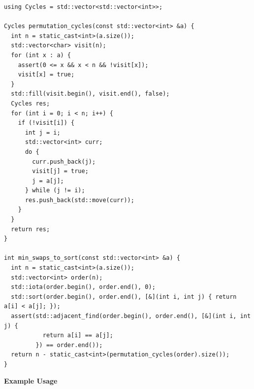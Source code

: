 \begin{lstlisting}[style=cpp]
using Cycles = std::vector<std::vector<int>>;

Cycles permutation_cycles(const std::vector<int> &a) {
  int n = static_cast<int>(a.size());
  std::vector<char> visit(n);
  for (int x : a) {
    assert(0 <= x && x < n && !visit[x]);
    visit[x] = true;
  }
  std::fill(visit.begin(), visit.end(), false);
  Cycles res;
  for (int i = 0; i < n; i++) {
    if (!visit[i]) {
      int j = i;
      std::vector<int> curr;
      do {
        curr.push_back(j);
        visit[j] = true;
        j = a[j];
      } while (j != i);
      res.push_back(std::move(curr));
    }
  }
  return res;
}

int min_swaps_to_sort(const std::vector<int> &a) {
  int n = static_cast<int>(a.size());
  std::vector<int> order(n);
  std::iota(order.begin(), order.end(), 0);
  std::sort(order.begin(), order.end(), [&](int i, int j) { return a[i] < a[j]; });
  assert(std::adjacent_find(order.begin(), order.end(), [&](int i, int j) {
           return a[i] == a[j];
         }) == order.end());
  return n - static_cast<int>(permutation_cycles(order).size());
}
\end{lstlisting}
\textbf{Example Usage}\par
